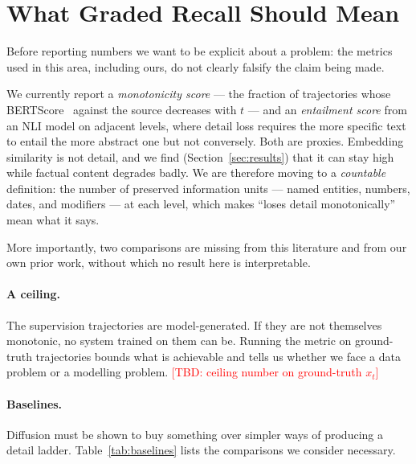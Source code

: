 \documentclass{article}
\newcommand{\tbd}[1]{\textcolor{red}{[TBD: #1]}}
\begin{document}
\section{What Graded Recall Should Mean}
\label{sec:measure}

Before reporting numbers we want to be explicit about a problem: the metrics used in this area, including ours, do not clearly falsify the claim being made.

We currently report a \emph{monotonicity score} --- the fraction of trajectories whose BERTScore~\citep{zhang2020} against the source decreases with $t$ --- and an \emph{entailment score} from an NLI model on adjacent levels, where detail loss requires the more specific text to entail the more abstract one but not conversely. Both are proxies. Embedding similarity is not detail, and we find (Section~\ref{sec:results}) that it can stay high while factual content degrades badly. We are therefore moving to a \emph{countable} definition: the number of preserved information units --- named entities, numbers, dates, and modifiers --- at each level, which makes ``loses detail monotonically'' mean what it says.

More importantly, two comparisons are missing from this literature and from our own prior work, without which no result here is interpretable.

\paragraph{A ceiling.} The supervision trajectories are model-generated. If they are not themselves monotonic, no system trained on them can be. Running the metric on ground-truth trajectories bounds what is achievable and tells us whether we face a data problem or a modelling problem. \tbd{ceiling number on ground-truth $x_t$}

\paragraph{Baselines.} Diffusion must be shown to buy something over simpler ways of producing a detail ladder. Table~\ref{tab:baselines} lists the comparisons we consider necessary.
\end{document}
